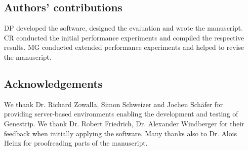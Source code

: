 \documentclass[pdflatex,sn-vancouver-num]{sn-jnl}
\begin{document}
\subsection{Authors' contributions}

DP developed the software, designed the evaluation and wrote the manuscript. CR conducted the initial performance experiments and compiled the respective results. MG conducted extended performance experiments and helped to revise the manuscript.

\subsection{Acknowledgements}

We thank Dr. Richard Zowalla, Simon Schweizer and Jochen Sch\"afer for providing server-based environments enabling the development and testing of Genestrip. We thank Dr. Robert Friedrich, Dr. Alexander Windberger for their feedback when initially applying the software. Many thanks also to Dr. Alois Heinz for proofreading parts of the manuscript.

    \clearpage
    \nocite{Wensel:2022aa,16srrnause,Mendelson2016WhatIT,Sayers:2025aa,biobloom,Flajolet07hyperloglog,Tange2011a,oeisA000045}
    
\end{document}
